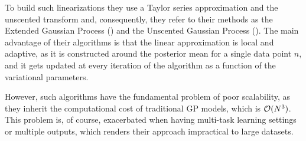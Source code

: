 To build such linearizations they use a Taylor series approximation and the unscented transform 
and, consequently, they refer to their methods  as the Extended Gaussian Process (\egp) and 
the Unscented Gaussian Process (\ugp). 
The main advantage of their algorithms is that the linear
approximation is local and adaptive, as it is constructed around the posterior mean for a
single data point $n$, and it gets updated at every iteration of the algorithm as a function
of the variational parameters. 

However, such algorithms have the fundamental problem of poor scalability, as they 
inherit the computational cost of traditional GP models, which is $\mathcal{O}(N^3)$. This 
problem is, of course, exacerbated when having multi-task learning settings or multiple
outputs, which renders their approach impractical to large datasets.  


